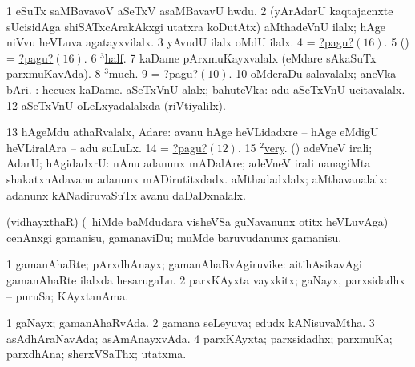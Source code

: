 \noindent
\gl{\pagu}
\bmng
\bnum
\num{1}  eSuTx saMBavavoV aSeTxV asaMBavavU hwdu. 
\num{2}  (yArAdarU kaqtajacnxte sUcisidAga shiSATxcArakAkxgi utatxra koDutAtx) aMthadeVnU ilalx; hAge niVvu heVLuva agatayxvilalx. 
\num{3}  yAvudU ilalx oMdU ilalx. 
\num{4}  = \hyperlink{notpagu16}{?pagu?\((16)\)}. 
\num{5} (\pArxparx) = \hyperlink{notpagu16}{?pagu?\((16)\)}. 
\num{6}  \hyperref{kandict_h.pdf}{H}{half(3) nuga}{$^3$half}. 
\num{7}  kaDame pArxmuKayxvalalx (eMdare sAkaSuTx parxmuKavAda). 
\num{8}  \hyperref{kandict_m.pdf}{M}{much(3) pagu(6)}{$^3$much}. 
\num{9}  = \hyperlink{notpagu10}{?pagu?\((10)\)}. 
\hypertarget{notpagu10}{} 
\num{10}  oMderaDu salavalalx; aneVka bAri. 
 : 
\banum
{} hecucx kaDame. 
 aSeTxVnU alalx; bahuteVka:  adu aSeTxVnU ucitavalalx. 
\hypertarget{notpagu12}{} 
\eanum
\numie
\num{12}  aSeTxVnU oLeLxyadalalxda (riVtiyalilx). 
\num{13}  hAgeMdu athaRvalalx, Adare:  avanu hAge heVLidadxre -- hAge eMdigU heVLiralAra -- adu suLuLx. 
\num{14}  = \hyperlink{notpagu12}{?pagu?\((12)\)}. 
\num{15}  \hyperref{kandict_v.pdf}{V}{very(2) pagu(1)}{$^2$very}. 
\hypertarget{notpagu16}{} 
 (\pArxparx) 
\banum
{} adeVneV irali; AdarU; hAgidadxrU:  nAnu adanunx mADalAre; adeVneV irali nanagiMta shakatxnAdavanu adanunx mADirutitxdadx. 
 aMthadadxlalx; aMthavanalalx: adanunx kANadiruvaSuTx avanu daDaDxnalalx. 
\eanum
\numie
\enum
\emng
\eentry

\bentry
{}
\gl{\sakirx}
\expl{\Latin}
\bmng
(vidhayxthaR) (\sA\ hiMde baMdudara visheVSa guNavanunx otitx heVLuvAga) cenAnxgi gamanisu, gamanaviDu; muMde baruvudanunx gamanisu. 
\emng
\eentry

\bentry
{}
\gl{\nA}
\bmng
\bnum
\num{1} gamanAhaRte; pArxdhAnayx; gamanAhaRvAgiruvike:  aitihAsikavAgi gamanAhaRte ilalxda hesarugaLu. 
\num{2} parxKAyxta vayxkitx; gaNayx, parxsidadhx -- puruSa; KAyxtanAma. 
\enum
\emng
\eentry

\bentry
{}
\gl{\gu}
\bmng
\bnum
\num{1} gaNayx; gamanAhaRvAda. 
\num{2} gamana seLeyuva; edudx kANisuvaMtha. 
\num{3} asAdhAraNavAda; asAmAnayxvAda. 
\num{4} parxKAyxta; parxsidadhx; parxmuKa; parxdhAna; sherxVSaThx; utatxma. 
\enum
\emng
\eentry

